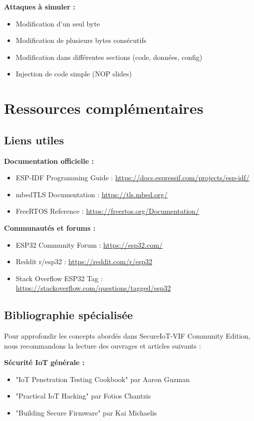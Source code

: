\textbf{Attaques à simuler :}
\begin{itemize}
    \item Modification d'un seul byte
    \item Modification de plusieurs bytes consécutifs
    \item Modification dans différentes sections (code, données, config)
    \item Injection de code simple (NOP slides)
\end{itemize}

\section{Ressources complémentaires}
\label{app:resources}

\subsection{Liens utiles}

\textbf{Documentation officielle :}
\begin{itemize}
    \item ESP-IDF Programming Guide : \url{https://docs.espressif.com/projects/esp-idf/}
    \item mbedTLS Documentation : \url{https://tls.mbed.org/}
    \item FreeRTOS Reference : \url{https://freertos.org/Documentation/}
\end{itemize}

\textbf{Communautés et forums :}
\begin{itemize}
    \item ESP32 Community Forum : \url{https://esp32.com/}
    \item Reddit r/esp32 : \url{https://reddit.com/r/esp32}
    \item Stack Overflow ESP32 Tag : \url{https://stackoverflow.com/questions/tagged/esp32}
\end{itemize}

\subsection{Bibliographie spécialisée}

Pour approfondir les concepts abordés dans SecureIoT-VIF Community Edition, nous recommandons la lecture des ouvrages et articles suivants :

\textbf{Sécurité IoT générale :}
\begin{itemize}
    \item "IoT Penetration Testing Cookbook" par Aaron Guzman
    \item "Practical IoT Hacking" par Fotios Chantzis
    \item "Building Secure Firmware" par Kai Michaelis
\end{itemize}

